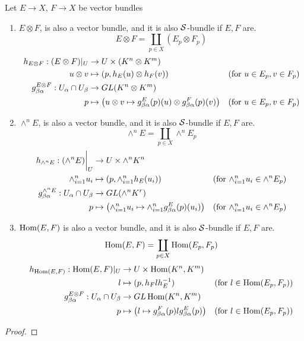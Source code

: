 \begin{proposition}
	Let $E \to X$, $F \to X$ be vector bundles
	\begin{enumerate}
		\item $E \otimes F$, is also a vector bundle, and it is also $\Str$-bundle if $E, F$ are.
		$$
		E \otimes F = \coprod_{p \in X} (E_p \otimes F_p)
		$$
		\begin{align*}
			h_{E \otimes F}: (E \otimes F)\vert_U &\to U \times (K^n \otimes K^m) \\
			u \otimes v &\mapsto (p, h_E(u) \otimes h_F(v)) &\text{(for $u \in E_p, v \in F_p$)}\\
			g_{\beta \alpha}^{E \otimes F}: U_\alpha \cap U_\beta &\to GL(K^n \otimes K^m) \\
			p &\mapsto \tuple*{u \otimes v \mapsto g_{\beta \alpha}^E(p)(u) \otimes g_{\beta \alpha}^F(p)(v)} &\text{(for $u \in E_p, v \in F_p$)}
		\end{align*}
		
		\item $\wedge^n E$, is also a vector bundle, and it is also $\Str$-bundle if $E, F$ are.
		$$
		\wedge^n E = \coprod_{p \in X} \wedge^n E_p
		$$
		\begin{align*}
			h_{\wedge^n E}: \tuple*{\wedge^n E}\bigg\vert_U &\to U \times \wedge^n K^n \\
			\wedge^n_{i=1} u_i &\mapsto \tuple*{p, \wedge^n_{i=1} h_E(u_i)} &\text{(for $\wedge^n_{i=1} u_i \in \wedge^n E_p$)}\\
			g_{\beta \alpha}^{\wedge^n E}: U_\alpha \cap U_\beta &\to GL\tuple*{\wedge^n K^r} \\
			p &\mapsto \tuple*{\wedge^n_{i=1} u_i \mapsto \wedge^n_{i=1} g_{\beta \alpha}^E(p)(u_i)} &\text{(for $\wedge^n_{i=1} u_i \in \wedge^n E_p$)}
		\end{align*}
		
		\item $\Hom(E, F)$ is also a vector bundle, and it is also $\Str$-bundle if $E, F$ are.
		$$
		\Hom(E, F) = \coprod_{p \in X} \Hom(E_p, F_p)
		$$
		\begin{align*}
			h_{\Hom(E, F)}: \Hom(E, F)\vert_U &\to U \times \Hom(K^n, K^m) \\
			l &\mapsto (p, h_F l h_E^{-1}) &\text{(for $l \in \Hom(E_p, F_p)$)}\\
			g_{\beta \alpha}^{E \otimes F}: U_\alpha \cap U_\beta &\to GL \Hom(K^n, K^m)\\
			p &\mapsto \tuple*{l \mapsto g_{\beta \alpha}^F(p) l g_{\beta \alpha}^E(p)} &\text{(for $l \in \Hom(E_p, F_p)$)}
		\end{align*}
	\end{enumerate}
	\begin{proof}
	\end{proof}
\end{proposition}

